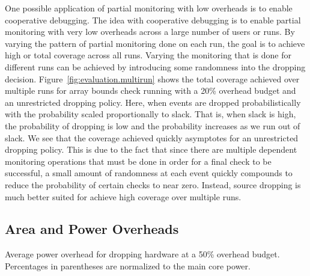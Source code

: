 One possible application of partial monitoring with low overheads is to enable
cooperative debugging. The idea with cooperative debugging is to enable partial
monitoring with very low overheads across a large number of users or runs. By
varying the pattern of partial monitoring done on each run, the goal is to
achieve high or total coverage across all runs. Varying the monitoring that is
done for different runs can be achieved by introducing some randomness into the
dropping decision. Figure~\ref{fig:evaluation.multirun} shows the total
coverage achieved over multiple runs for array bounds check running with a 20\%
overhead budget and an unrestricted dropping policy. Here, when events are
dropped probabilistically with the probability scaled proportionally to slack.
That is, when slack is high, the probability of dropping is low and the
probability increases as we run out of slack. We see that the coverage achieved
quickly asymptotes for an unrestricted dropping policy. This is due to the fact
that since there are multiple dependent monitoring operations that must be done
in order for a final check to be successful, a small amount of randomness at
each event quickly compounds to reduce the probability of certain checks to
near zero. Instead, source dropping is much better suited for achieve high
coverage over multiple runs.

\subsection{Area and Power Overheads}

\begin{table}[tb]
  \begin{center}
    \vspace{-0.0in}
    \begin{footnotesize}
    
    \end{footnotesize}
    \caption{Average power overhead for dropping hardware at a 50\% overhead
    budget. Percentages in parentheses are normalized to the main core
    power.}
    \vspace{-0.2in}
    \label{tab:evaluation.area_power}
  \end{center}
\end{table}

